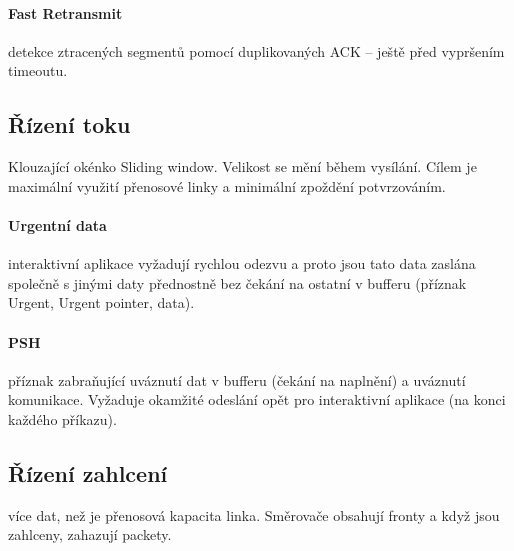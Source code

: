 \documentclass[a4paper, 11pt]{report}
\begin{document}
\paragraph{Fast Retransmit}
detekce ztracených segmentů pomocí duplikovaných ACK -- ještě před vypršením timeoutu.

\subsection{Řízení toku} Klouzající okénko Sliding window. Velikost se mění během vysílání. Cílem je maximální využití přenosové linky a minimální zpoždění potvrzováním.

\paragraph{Urgentní data} interaktivní aplikace vyžadují rychlou odezvu a proto jsou tato data zaslána společně s jinými daty přednostně bez čekání na ostatní v bufferu (příznak Urgent, Urgent pointer, data).

\paragraph{PSH} příznak zabraňující uváznutí dat v bufferu (čekání na naplnění) a uváznutí komunikace. Vyžaduje okamžité odeslání opět pro interaktivní aplikace (na konci každého příkazu).

\subsection{Řízení zahlcení}

více dat, než je přenosová kapacita linka. Směrovače obsahují fronty a když jsou zahlceny, zahazují packety.
\end{document}
